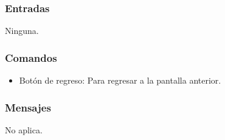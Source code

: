 \subsubsection{Entradas}
	\noindent
	Ninguna.

\subsubsection{Comandos}
\begin{itemize}
	\item Botón de regreso: Para regresar a la pantalla anterior.
	
\end{itemize}

\subsubsection{Mensajes}
	\noindent
	No aplica.





